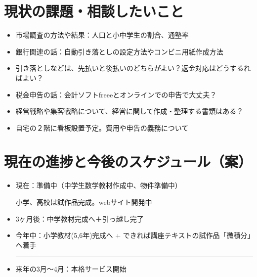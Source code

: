 ﻿\documentclass[12pt]{article}
\begin{document}
\section{現状の課題・相談したいこと}
\begin{itemize}[leftmargin=1.5em]
  \item 市場調査の方法や結果：人口と小中学生の割合、通塾率
  \item 銀行関連の話：自動引き落としの設定方法やコンビニ用紙作成方法
  \item 引き落としなどは、先払いと後払いのどちらがよい？返金対応はどうするればよい？
  \item 税金申告の話：会計ソフトfreeeとオンラインでの申告で大丈夫？
  \item 経営戦略や集客戦略について、経営に関して作成・整理する書類はある？
  \item 自宅の２階に看板設置予定。費用や申告の義務について
\end{itemize}


\section{現在の進捗と今後のスケジュール（案）}
\begin{itemize}[leftmargin=1.5em, parsep=4pt]
  \item 現在：準備中（中学生数学教材作成中、物件準備中）
    
  小学、高校は試作品完成。webサイト開発中
  
  \item 3ヶ月後：中学教材完成へ＋引っ越し完了
  \item 今年中：小学教材(5,6年)完成へ + できれば講座テキストの試作品「微積分」へ着手
  
  \vspace{4mm} \hrule height 1.5pt \vspace{3mm}
  
  \item 来年の3月～4月：本格サービス開始
\end{itemize}

\end{document}
